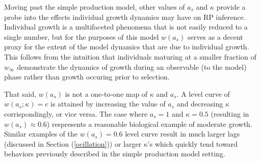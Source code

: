 %
Moving past the simple production model, other values of $a_s$ and $\kappa$ 
provide a probe into the effects individual growth dynamics may have on RP 
inference.
%
Individual growth is a multifaceted phenomena that is not easily reduced
to a single number, but for the purposes of this model $w(a_s)$ serves as a decent 
proxy for the extent of the model dynamics that are due to individual growth. %
%
This follows from the intuition that individuals maturing at a smaller fraction
of $w_\infty$ demonstrate the dynamics of growth during an observable (to the model) %
phase rather than growth occuring prior to selection. %

%
That said, $w(a_s)$ is not a one-to-one map of $\kappa$ and $a_s$.
%
A level curve of $w(a_s; \kappa)=c$ is attained by increasing the value of $a_s$
and decreasing $\kappa$ corrispondingly, or vice versa.
%
The case where $a_s=1$ and $\kappa=0.5$ (resulting in $w(a_s)\approx0.6$)
respresents a reasonable biological example of moderate growth.
%
Similar examples of the $w(a_s)=0.6$ level curve result in much larger lags
(discussed in Section (\ref{ocillation})) or larger $\kappa$'s which quickly
tend toward behaviors previously described in the simple production model
setting.

